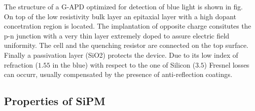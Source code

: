 The structure of a G-APD optimized for detection of blue light is shown in fig.
On top of the low resistivity bulk layer an epitaxial layer with a high dopant concetration region is located.
The implantation of opposite charge consitutes the p-n junction with a very thin layer extremely doped to assure electric field uniformity.
The cell and the quenching resistor are connected on the top surface.
Finally a passivation layer (SiO2) protects the device. Due to its low index of refraction ($1.55$ in the blue) with respect to the one of Silicon ($3.5$) Fresnel losses can occurr, usually compensated by the presence of anti-reflection coatings.


\subsection{Properties of SiPM}

